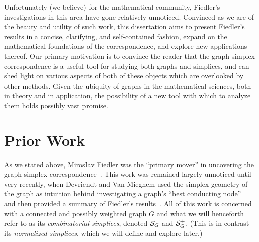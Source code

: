 Unfortunately (we believe) for  the mathematical community,  Fiedler's investigations in this area  have  gone relatively unnoticed. Convinced as we are of  the beauty and  utility of such  work, this dissertation aims to present Fiedler's  results in a concise, clarifying, and self-contained fashion,  expand on the mathematical  foundations of the correspondence, and explore new applications thereof. Our primary motivation is to convince the reader that the graph-simplex correspondence is a  useful tool for studying both graphs and simplices,  and  can shed light on various  aspects of both of these objects which are  overlooked by other  methods. Given the ubiquity of graphs in the mathematical  sciences, both in theory and in application, the possibility of a new tool with which to analyze them holds possibly vast promise. 



\section{Prior Work}
\label{sec:intro_prior_work}


As we stated  above, Miroslav Fiedler was the ``primary  mover''  in  uncovering the graph-simplex correspondence~\cite{fiedler1993geometric,fiedler2005geometry,fiedler2011matrices}.  This work was remained largely unnoticed until very recently, when Devriendt and Van Mieghem used the simplex geometry of the graph as intuition behind investigating  a graph's ``best conducting node''~\cite{van2017pseudoinverse} and  then provided a summary  of Fiedler's results~\cite{devriendt2018simplex}. All of this work is concerned  with a connected and possibly  weighted graph $G$ and what we will henceforth  refer to as its  \emph{combinatorial simplices},  denoted $\mathcal{S}_G$ and $\mathcal{S}_G^+$. (This is in contrast its \emph{normalized simplices}, which we  will define and explore later.) 


